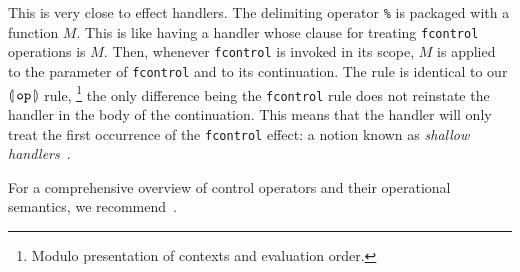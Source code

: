 This is very close to effect handlers. The delimiting operator \texttt{\%}
is packaged with a function $M$. This is like having a handler whose clause
for treating \texttt{fcontrol} operations is $M$. Then, whenever
\texttt{fcontrol} is invoked in its scope, $M$ is applied to the parameter
of \texttt{fcontrol} and to its continuation. The rule is identical to our
$\llparenthesis \, \mathtt{op} \, \rrparenthesis$ rule, \footnote{Modulo presentation of contexts and
  evaluation order.} the only difference being the \texttt{fcontrol} rule
does not reinstate the handler in the body of the continuation. This means
that the handler will only treat the first occurrence of the
\texttt{fcontrol} effect: a notion known as \emph{shallow
  handlers}~\cite{kammar2013handlers}.

For a comprehensive overview of control operators and their operational
semantics, we recommend~\cite{racket-continuations}.
